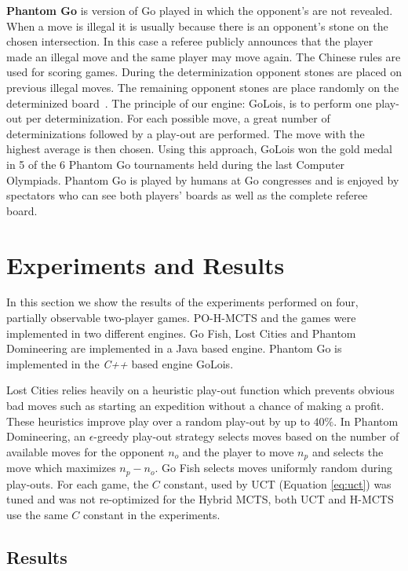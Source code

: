 \documentclass[a4paper]{llncs}
\begin{document}
{\sc \bf Phantom Go} is version of Go played in which the opponent's are not revealed. When a move is illegal it is usually because there is an opponent's stone on the chosen intersection. In this case a referee publicly announces that the player made an illegal move and the same player may move again. The Chinese rules are used for scoring games. During the determinization opponent stones are placed on previous illegal moves. The remaining opponent stones are place randomly on the determinized board~\cite{cazenave06}. The principle of our engine: {\sc GoLois}, is to perform one play-out per determinization. For each possible move, a great number of determinizations followed by a play-out are performed. The move with the highest average is then chosen. Using this approach, {\sc GoLois} won the gold medal in 5 of the 6 Phantom Go tournaments held during the last Computer Olympiads. Phantom Go is played by humans at Go congresses and is enjoyed by spectators who can see both players' boards as well as the complete referee board.

\section{Experiments and Results}
\label{sec:exp_res}
In this section we show the results of the experiments performed on four, partially observable two-player games. PO-H-MCTS and the games were implemented in two different engines. Go Fish, Lost Cities and Phantom Domineering are implemented in a Java based engine. Phantom Go is implemented in the \emph{C++} based engine {\sc GoLois}.

Lost Cities relies heavily on a heuristic play-out function which prevents obvious bad moves such as starting an expedition without a chance of making a profit. These heuristics improve play over a random play-out by up to $40\%$.
In Phantom Domineering, an $\epsilon$-greedy play-out strategy selects moves based on the number of available moves for the opponent $n_o$ and the player to move $n_p$ and selects the move which maximizes $n_p - n_o$.
Go Fish selects moves uniformly random during play-outs.
For each game, the $C$ constant, used by UCT (Equation \ref{eq:uct}) was tuned and was not re-optimized for the Hybrid MCTS, both UCT and H-MCTS use the same $C$ constant in the experiments.

\subsection{Results}
\label{subsec:results}
\end{document}
